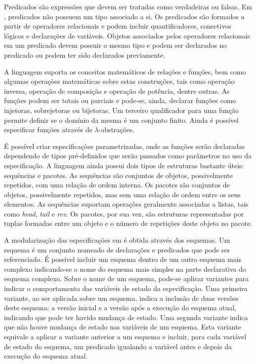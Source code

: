 Predicados são expressões que devem ser tratadas como verdadeiras ou falsas.
Em \Z, predicados não possuem um tipo associado a si.
Os predicados são formados a partir de operadores relacionais e podem incluir quantificadores, conectivos lógicos e declarações de variáveis.
Objetos associados pelos operadores relacionais em um predicado devem possuir o mesmo tipo e podem ser declarados no predicado ou podem ter sido declarados previamente.

A linguagem \Z suporta os conceitos matemáticos de relações e funções, bem como algumas operações matemáticas sobre estas construções, tais como operação inversa, operação de composição e operação de potência, dentre outras.
As funções podem ser totais ou parciais e pode-se, ainda, declarar funções como injetoras, sobrejetoras ou bijetoras.
Um terceiro qualificador para uma função permite definir se o domínio da mesma é um conjunto finito.
Ainda é possível especificar funções através de $\lambda$-abstrações.

É possível criar especificações parametrizadas, onde as funções serão declaradas dependendo de tipos pré-definidos que serão passados como parâmetros no uso da especificação.
A linguagem ainda possui dois tipos de estruturas bastante úteis: sequências e pacotes.
As sequências são conjuntos de objetos, possivelmente repetidos, com uma relação de ordem interna.
Os pacotes são conjuntos de objetos, possivelmente repetidos, mas sem uma relação de ordem entre os seus elementos.
As sequências suportam operações geralmente associadas a listas, tais como \textit{head}, \textit{tail} e \textit{rev}.
Os pacotes, por sua vez, são estruturas representadas por tuplas formadas entre um objeto e o número de repetições deste objeto no pacote.

A modularização das especificações em \Z é obtida através dos esquemas.
Um esquema é um conjunto nomeado de declarações e predicados que pode ser referenciado.
É possível incluir um esquema dentro de um outro esquema mais complexo indicando-se o nome do esquema mais simples na parte declarativa do esquema complexo.
Sobre o nome de um esquema, pode-se aplicar variantes para indicar o comportamento das variáveis de estado da especificação.
Uma primeira variante, ao ser aplicada sobre um esquema, indica a inclusão de duas versões deste esquema: a versão inicial e a versão após a execução do esquema atual, indicando que pode ter havido mudança de estado.
Uma segunda variante indica que não houve mudança de estado nas variáveis de um esquema.
Esta variante equivale a aplicar a variante anterior a um esquema e incluir, para cada variável de estado do esquema, um predicado igualando a variável antes e depois da execução do esquema atual.


